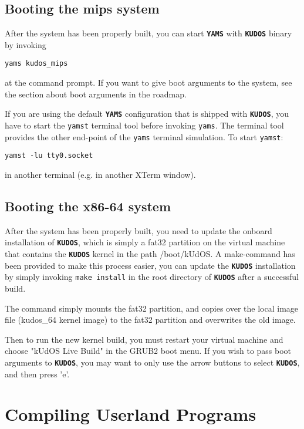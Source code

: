 \documentclass[twoside,a4paper]{report}
\newcommand{\kudos}{\texttt{\textbf{KUDOS}}}
\newcommand{\yams}{\texttt{\textbf{YAMS}}}
\begin{document}
\subsection{Booting the mips system}
After the system has been properly built, you can start \yams{} with
\kudos{} binary by invoking
\begin{verbatim}
yams kudos_mips
\end{verbatim}
at the command prompt. If you want to give boot arguments to the
system, see the section about boot arguments in the roadmap.

If you are using the default \yams{} configuration that is shipped
with \kudos{}, you have to start the \texttt{yamst} terminal tool
before invoking \texttt{yams}. The terminal tool provides the other
end-point of the \texttt{yams} terminal simulation. To start
\texttt{yamst}:
\begin{verbatim}
yamst -lu tty0.socket
\end{verbatim}
in another terminal (e.g. in another XTerm window).

\subsection{Booting the x86-64 system}
After the system has been properly built, you need to update the
onboard installation of \kudos{}, which is simply a fat32 partition 
on the virtual machine that contains the \kudos{} kernel in the path 
/boot/kUdOS. A make-command has been provided to make
this process easier, you can update the \kudos{} installation by simply
invoking \texttt{make install} in the root directory of \kudos{} after a 
successful build.

The command simply mounts the fat32 partition, and copies over the local
image file (kudos\_64 kernel image) to the fat32 partition and overwrites the 
old image.

Then to run the new kernel build, you must restart your virtual machine
and choose "kUdOS Live Build" in the GRUB2 boot menu. If you wish to
pass boot arguments to \kudos{}, you may want to only use the arrow buttons
to select \kudos{}, and then press 'e'.


\section{Compiling Userland Programs}
\label{sec:compilinguserland}
\end{document}
